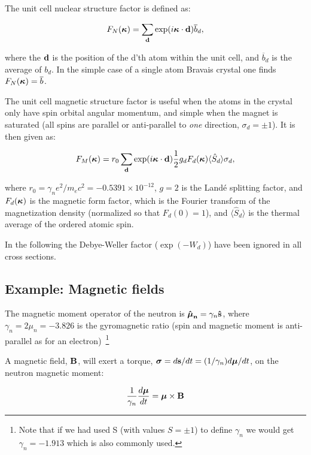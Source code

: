 The unit cell nuclear structure factor is defined as:

\begin{equation}
  F_N(\mathbf{\mbox{\boldmath $\kappa$}}) = \sum_{\mathbf{d}}
  \exp(i\mathbf{\mbox{\boldmath $\kappa$}} \cdot \mathbf{d})\overline{b}_d,
\end{equation}

where the $\mathbf{d}$ is the position of the d'th atom within the unit cell,
and $\overline{b}_d$ is the average of $b_d$. In the simple case of a
single atom Bravais crystal one finds $F_N(\mathbf{\mbox{\boldmath $\kappa$}}) = \overline{b}$.

The unit cell magnetic structure factor is useful when the atoms in
the crystal only have spin orbital angular momentum, and simple when
the magnet is saturated (all spins are parallel or anti-parallel to
\emph{one} direction, $\sigma_d=\pm1$). It is then given as: 

\begin{equation}
  F_M(\mathbf{\mbox{\boldmath $\kappa$}}) =
  r_0 \sum_{\mathbf{d}} \exp(i\mathbf{\mbox{\boldmath $\kappa$}} \cdot \mathbf{d})\frac{1}{2}g_d F_d(\mathbf{\mbox{\boldmath $\kappa$}})\langle
  \hat{S}_d\rangle \sigma_d,
\end{equation}

where $r_0=\gamma_n e^2/m_e c^2 = -0.5391 \times 10^{-12}$, $g=2$ is the
Land{\'e} splitting factor, and $F_d(\mathbf{\mbox{\boldmath $\kappa$}})$ is the magnetic form factor, which
is the Fourier transform of the magnetization density (normalized so that
$F_d(0) = 1$), and $\langle \hat{S}_d\rangle$ is the thermal average of the
ordered atomic spin.

In the following the Debye-Weller factor ($\exp(-W_d)$) have been ignored in
all cross sections.

\subsection{Example: Magnetic fields}

The magnetic moment operator of the neutron is $\mathbf{\hat{\mbox{\boldmath $\mu$}}_n} = \gamma_n \mathbf{\hat{s}}$, where
$\gamma_n = 2 \mu_n = -3.826$ is the gyromagnetic ratio (spin and magnetic
moment is anti-parallel as for an electron)~\footnote{Note that if we had used
S (with values $S=\pm 1$) to define $\gamma_n$ we would get $\gamma_n =
-1.913$ which is also commonly used.}

A magnetic field, $\mathbf{B}$, will exert a torque, $\mbox{\boldmath $\sigma$} = d\mathbf{s}/dt = (1/\gamma_n)d\mbox{\boldmath $\mu$}/dt$, on the neutron magnetic moment:
 
\begin{equation}
  \label{eq:torque}
  \frac{1}{\gamma_n} \frac{d\mbox{\boldmath $\mu$}}{dt} = \mbox{\boldmath $\mu$} \times \mathbf{B}
\end{equation}
 
